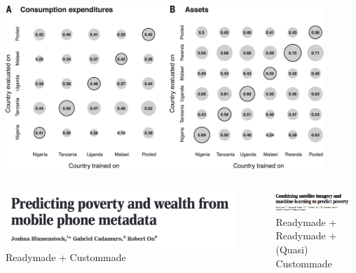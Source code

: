 \documentclass[aspectratio=169]{beamer}
\begin{document}
\begin{frame}

\begin{center}
\includegraphics[width=0.9\textwidth]{figures/jean_combining_2016_fig5}
\end{center}

\end{frame}
\begin{frame}

\begin{columns}
\begin{column}{0.5\textwidth}
\begin{center}
\includegraphics[width=0.9\textwidth]{figures/blumenstock_predicting_2015_title}\\
Readymade + Custommade
\end{center}
\end{column}
\begin{column}{0.5\textwidth}  
\begin{center}
\includegraphics[width=0.9\textwidth]{figures/jean_combining_2016_title}\\
Readymade + Readymade + (Quasi) Custommade
\end{center}
\end{column}
\end{columns}

\end{frame}
\end{document}
